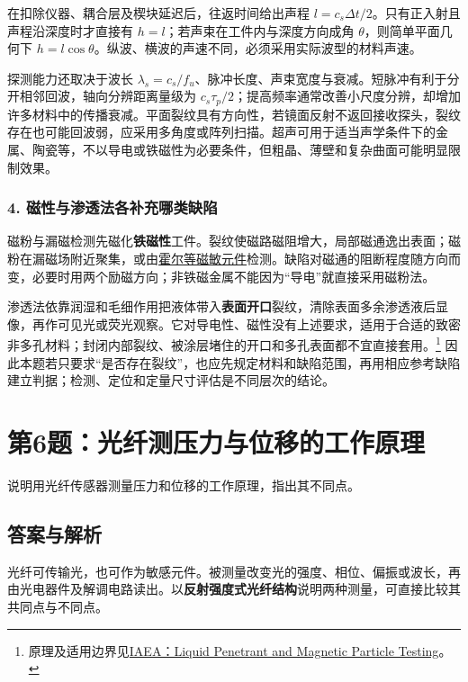 在扣除仪器、耦合层及楔块延迟后，往返时间给出声程 $l=c_s\Delta t/2$。只有正入射且声程沿深度时才直接有 $h=l$；若声束在工件内与深度方向成角 $\theta$，则简单平面几何下 $h=l\cos\theta$。纵波、横波的声速不同，必须采用实际波型的材料声速。

探测能力还取决于波长 $\lambda_s=c_s/f_u$、脉冲长度、声束宽度与衰减。短脉冲有利于分开相邻回波，轴向分辨距离量级为 $c_s\tau_p/2$；提高频率通常改善小尺度分辨，却增加许多材料中的传播衰减。平面裂纹具有方向性，若镜面反射不返回接收探头，裂纹存在也可能回波弱，应采用多角度或阵列扫描。超声可用于适当声学条件下的金属、陶瓷等，不以导电或铁磁性为必要条件，但粗晶、薄壁和复杂曲面可能明显限制效果。

\subsubsection*{4. 磁性与渗透法各补充哪类缺陷}
磁粉与漏磁检测先磁化\textbf{铁磁性}工件。裂纹使磁路磁阻增大，局部磁通逸出表面；磁粉在漏磁场附近聚集，或由\hyperref[kn:4-4]{霍尔等磁敏元件}检测。缺陷对磁通的阻断程度随方向而变，必要时用两个励磁方向；非铁磁金属不能因为“导电”就直接采用磁粉法。

渗透法依靠润湿和毛细作用把液体带入\textbf{表面开口}裂纹，清除表面多余渗透液后显像，再作可见光或荧光观察。它对导电性、磁性没有上述要求，适用于合适的致密非多孔材料；封闭内部裂纹、被涂层堵住的开口和多孔表面都不宜直接套用。\footnote{原理及适用边界见\href{https://www-pub.iaea.org/MTCD/Publications/PDF/TCS-11.pdf}{IAEA：Liquid Penetrant and Magnetic Particle Testing}。}
因此本题若只要求“是否存在裂纹”，也应先规定材料和缺陷范围，再用相应参考缺陷建立判据；检测、定位和定量尺寸评估是不同层次的结论。

\section{第6题：光纤测压力与位移的工作原理}
\label{hw:4-6}
\begin{hwquestion}
说明用光纤传感器测量压力和位移的工作原理，指出其不同点。
\end{hwquestion}

\subsection*{答案与解析}
光纤可传输光，也可作为敏感元件。被测量改变光的强度、相位、偏振或波长，再由光电器件及解调电路读出。以\textbf{反射强度式光纤结构}说明两种测量，可直接比较其共同点与不同点。

